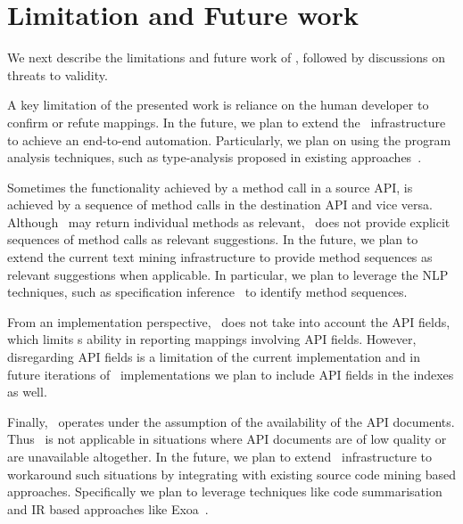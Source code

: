\section{Limitation and Future work}
\label{sec:discussion}

We next describe the limitations and future work of \tool,
followed by discussions on threats to validity.


A key limitation of the presented work is reliance on the human developer
to confirm or refute mappings.
In the future, we plan to extend the \tool\ infrastructure to achieve an end-to-end automation. 
Particularly, we plan on using the program analysis techniques, 
such as type-analysis proposed in
existing approaches~\cite{nguyen2014statistical,zhong09SE}.



Sometimes the functionality achieved by a method call in a source API,
is achieved by a sequence of method calls in the destination API and vice versa.
Although \tool\ may return individual methods as relevant, 
\tool\ does not provide explicit sequences of method calls as relevant suggestions.
In the future, we plan to extend the current text mining infrastructure
to provide method sequences as relevant suggestions when applicable. 
In particular, we plan to leverage the NLP techniques, such as
specification inference~\cite{pandita12:inferring} to identify method sequences. 



From an implementation perspective, \tool\ does not take into account 
the API fields,
which limits \tool s ability in reporting mappings involving API fields.
However, disregarding API fields is a limitation of the current implementation 
and in future iterations of \tool\ implementations we plan to include API fields in the indexes as well.

Finally, \tool\ operates under the assumption of the availability of the API documents.
Thus \tool\ is not applicable in situations where API documents are of low quality or are unavailable altogether.
In the future, we plan to extend \tool\ infrastructure to workaround such situations
by integrating with existing source code mining based approaches.
Specifically we plan to leverage techniques like code summarisation~\cite{sridhara2011ICPC} and IR based approaches like Exoa~\cite{kim2010towards}.

